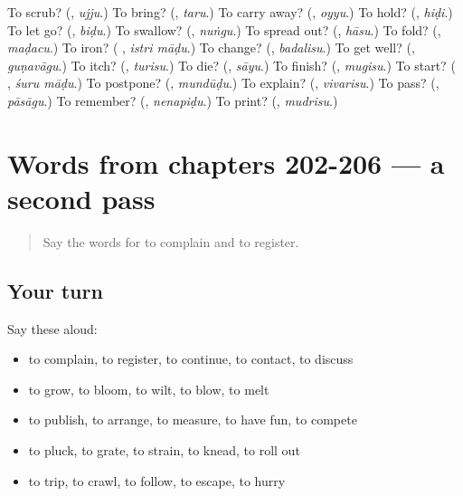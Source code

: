 \begin{tcolorbox}[breakable,colback=teal!4,colframe=teal!35!black,title={Before you move on}]
To scrub? (\textbf{}, \emph{ujju}.) To bring? (\textbf{}, \emph{taru}.) To carry away? (\textbf{}, \emph{oyyu}.) To hold? (\textbf{}, \emph{hiḍi}.) To let go? (\textbf{}, \emph{biḍu}.) To swallow? (\textbf{}, \emph{nuṅgu}.) To spread out? (\textbf{}, \emph{hāsu}.) To fold? (\textbf{}, \emph{maḍacu}.) To iron? (\textbf{ }, \emph{istri māḍu}.) To change? (\textbf{}, \emph{badalisu}.) To get well? (\textbf{}, \emph{guṇavāgu}.) To itch? (\textbf{}, \emph{turisu}.) To die? (\textbf{}, \emph{sāyu}.) To finish? (\textbf{}, \emph{mugisu}.) To start? (\textbf{ }, \emph{śuru māḍu}.) To postpone? (\textbf{}, \emph{mundūḍu}.) To explain? (\textbf{}, \emph{vivarisu}.) To pass? (\textbf{}, \emph{pāsāgu}.) To remember? (\textbf{}, \emph{nenapiḍu}.) To print? (\textbf{}, \emph{mudrisu}.)
\end{tcolorbox}
\section[(dialogue)]{Words from chapters 202-206 — a second pass}

\label{lesson:KA-R206-second-pass-words-from-chapters-202-206}



\begin{quote}
Say the words for to complain and to register.
\end{quote}

\subsection*{Your turn}
Say these aloud:

\begin{itemize}
\raggedright
  \item to complain, to register, to continue, to contact, to discuss
  \item to grow, to bloom, to wilt, to blow, to melt
  \item to publish, to arrange, to measure, to have fun, to compete
  \item to pluck, to grate, to strain, to knead, to roll out
  \item to trip, to crawl, to follow, to escape, to hurry
\end{itemize}

